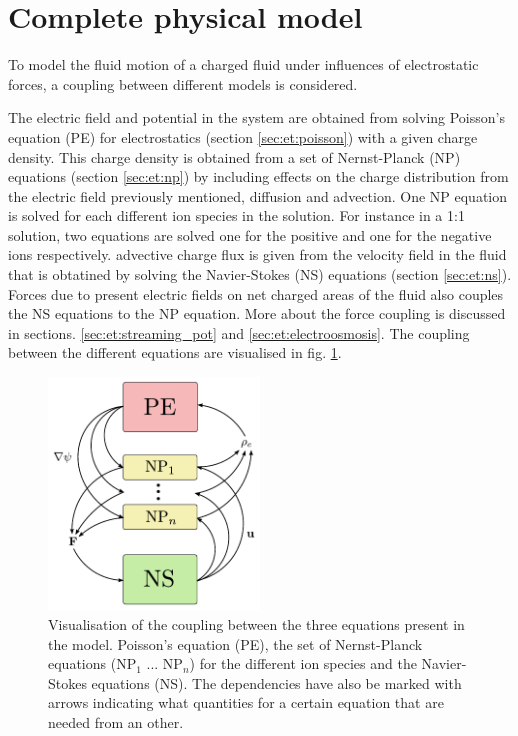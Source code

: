 \section{Complete physical model}\label{sec:et:coupling}
To model the fluid motion of a charged fluid under influences of
electrostatic forces, a coupling between different models is
considered.

The electric field and potential in the system are obtained from
solving Poisson's equation (PE) for electrostatics (section
\ref{sec:et:poisson}) with a given charge density. This charge density
is obtained from a set of Nernst-Planck (NP) equations (section
\ref{sec:et:np}) by including effects on the charge distribution from
the electric field previously mentioned, diffusion and advection. One
NP equation is solved for each different ion species in the
solution. For instance in a 1:1 solution, two equations are solved one
for the positive and one for the negative ions respectively.
advective charge flux is given from the velocity field in the fluid
that is obtatined by solving the Navier-Stokes (NS) equations (section
\ref{sec:et:ns}). Forces due to present electric fields on net charged
areas of the fluid also couples the NS equations to the NP
equation. More about the force coupling is discussed in
sections. \ref{sec:et:streaming_pot} and
\ref{sec:et:electroosmosis}. The coupling between the different
equations are visualised in fig. \ref{fig:coupling}.


\begin{figure}
\begin{center}
\includegraphics[width=0.5\textwidth]{fig/coupling.pdf}
\end{center}
\caption[Visualisation of the coupling between the equations
  present in the model.]{Visualisation of the coupling between the
  three equations present in the model. Poisson's equation (PE), the
  set of Nernst-Planck equations (NP$_1$ ... NP$_n$) for the different
  ion species and the Navier-Stokes equations (NS). The dependencies
  have also be marked with arrows indicating what quantities for a
  certain equation that are needed from an other.}
\label{fig:coupling}
\end{figure}


